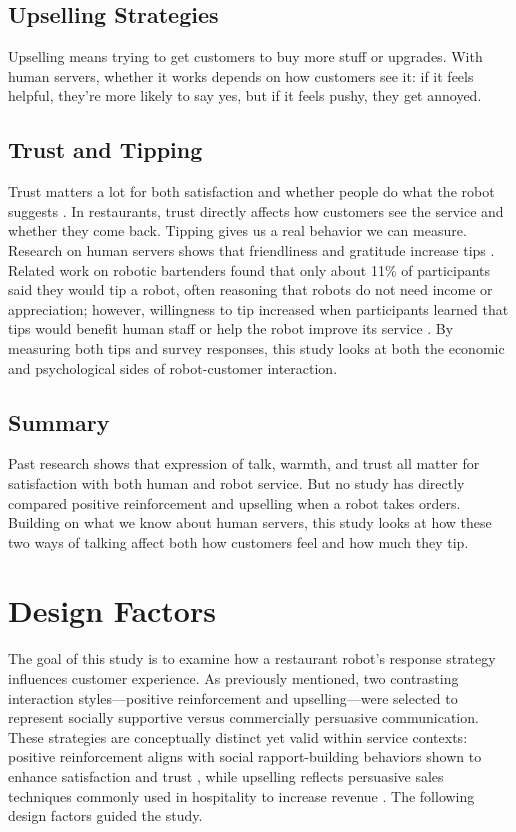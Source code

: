 \documentclass[conference]{IEEEtran}
\begin{document}
\subsection{Upselling Strategies}
Upselling means trying to get customers to buy more stuff or upgrades. With human servers, whether it works depends on how customers see it: if it feels helpful, they're more likely to say yes, but if it feels pushy, they get annoyed.

\subsection{Trust and Tipping}
Trust matters a lot for both satisfaction and whether people do what the robot suggests \cite{b6}. In restaurants, trust directly affects how customers see the service and whether they come back. Tipping gives us a real behavior we can measure. Research on human servers shows that friendliness and gratitude increase tips \cite{b4}. Related work on robotic bartenders found that only about 11\% of participants said they would tip a robot, often reasoning that robots do not need income or appreciation; however, willingness to tip increased when participants learned that tips would benefit human staff or help the robot improve its service \cite{b10}. By measuring both tips and survey responses, this study looks at both the economic and psychological sides of robot-customer interaction.

\subsection{Summary}
Past research shows that expression of talk, warmth, and trust all matter for satisfaction with both human and robot service. But no study has directly compared positive reinforcement and upselling when a robot takes orders. Building on what we know about human servers, this study looks at how these two ways of talking affect both how customers feel and how much they tip.

\section{Design Factors}
\label{sec:design_factors}
The goal of this study is to examine how a restaurant robot's response strategy influences customer experience. As previously mentioned, two contrasting interaction styles—positive reinforcement and upselling—were selected to represent socially supportive versus commercially persuasive communication. These strategies are conceptually distinct yet valid within service contexts: positive reinforcement aligns with social rapport-building behaviors shown to enhance satisfaction and trust \cite{b3, b11, b6}, while upselling reflects persuasive sales techniques commonly used in hospitality to increase revenue \cite{b12, b13}. The following design factors guided the study.
\end{document}

